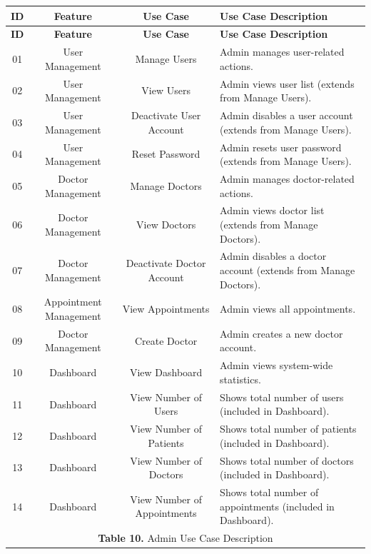 \documentclass[12pt,a4paper]{article}
\begin{document}
\renewcommand{\arraystretch}{1.5}
\begin{longtable}{|c|c|c|p{7.5cm}|}
\hline
\textbf{ID} & \textbf{Feature} & \textbf{Use Case} & \textbf{Use Case Description} \\
\hline
\endfirsthead

\hline
\textbf{ID} & \textbf{Feature} & \textbf{Use Case} & \textbf{Use Case Description} \\
\hline
\endhead

01 & User Management & Manage Users & Admin manages user-related actions. \\
\hline
02 & User Management & View Users & Admin views user list (extends from Manage Users). \\
\hline
03 & User Management & Deactivate User Account & Admin disables a user account (extends from Manage Users). \\
\hline
04 & User Management & Reset Password & Admin resets user password (extends from Manage Users). \\
\hline
05 & Doctor Management & Manage Doctors & Admin manages doctor-related actions. \\
\hline
06 & Doctor Management & View Doctors & Admin views doctor list (extends from Manage Doctors). \\
\hline
07 & Doctor Management & Deactivate Doctor Account & Admin disables a doctor account (extends from Manage Doctors). \\
\hline
08 & Appointment Management & View Appointments & Admin views all appointments. \\
\hline
09 & Doctor Management & Create Doctor & Admin creates a new doctor account. \\
\hline
10 & Dashboard & View Dashboard & Admin views system-wide statistics. \\
\hline
11 & Dashboard & View Number of Users & Shows total number of users (included in Dashboard). \\
\hline
12 & Dashboard & View Number of Patients & Shows total number of patients (included in Dashboard). \\
\hline
13 & Dashboard & View Number of Doctors & Shows total number of doctors (included in Dashboard). \\
\hline
14 & Dashboard & View Number of Appointments & Shows total number of appointments (included in Dashboard). \\
\hline
\multicolumn{4}{|c|}{\textbf{Table 10.} Admin Use Case Description} \\
\hline
\end{longtable}
\end{document}
